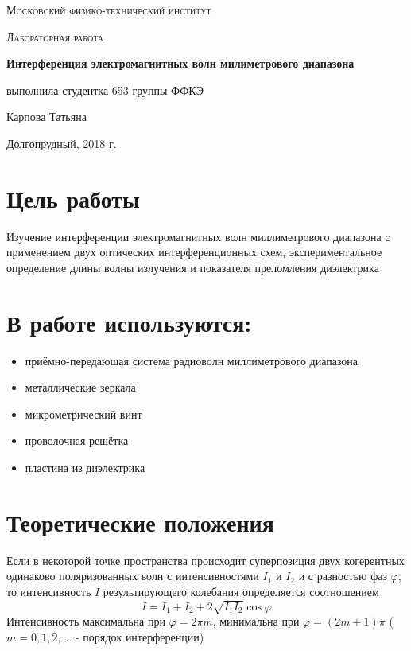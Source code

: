 \documentclass[a4paper]{article}
\begin{document}
\begin{titlepage}
	\centering
	\vspace{5cm}
	{\scshape\LARGE Московский физико-технический институт \par}
	\vspace{4cm}
	{\scshape\Large Лабораторная работа \par}
	\vspace{1cm}
	{\huge\bfseries Интерференция электромагнитных волн милиметрового диапазона \par}
	\vspace{1cm}
	\vfill
\begin{flushright}
	{\large выполнила студентка 653 группы ФФКЭ}\par
	\vspace{0.3cm}
	{\LARGE Карпова Татьяна} \par

\end{flushright}
	

	\vfill

	Долгопрудный, 2018 г.
\end{titlepage}

\section{Цель работы}
Изучение интерференции электромагнитных волн миллиметрового диапазона с применением двух оптических интерференционных схем, экспериментальное определение длины волны излучения и показателя преломления диэлектрика

\section{В работе используются:}
\begin{itemize}
    \item приёмно-передающая система радиоволн миллиметрового диапазона
    \item металлические зеркала
    \item микрометрический винт
    \item проволочная решётка
    \item пластина из диэлектрика
\end{itemize}

\section{Теоретические положения}
Если в некоторой точке пространства происходит суперпозиция двух когерентных одинаково поляризованных волн с интенсивностями $I_1$ и $I_2$ и с разностью фаз $\varphi$, то интенсивность $I$ результирующего колебания определяется соотношением 
\begin{equation}
    I = I_1 + I_2 + 2\sqrt{I_1 I_2}\cos \varphi
\end{equation}
Интенсивность максимальна при $\varphi = 2\pi m$, минимальна при $\varphi = (2m+1)\pi$ ($m = 0, 1, 2, ...$ - порядок интерференции)
\end{document}
